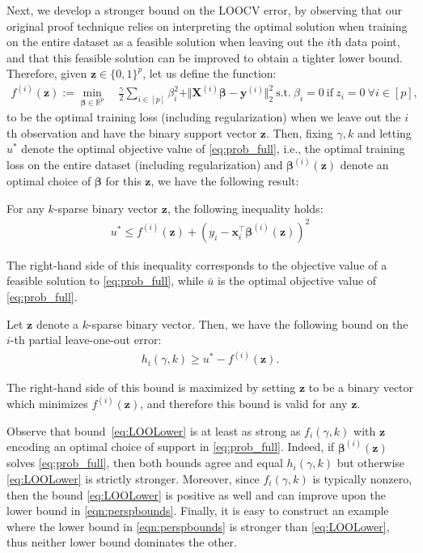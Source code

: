 \documentclass[opre,nonblindrev]{informs3} %
\begin{document}
Next, we develop a stronger bound on the LOOCV error, by observing that our original proof technique relies on interpreting the optimal solution when training on the entire dataset as a feasible solution when leaving out the $i$th data point, and that this feasible solution can be improved to obtain a tighter lower bound. Therefore, {given $\bm{z}\in \{0,1\}^p$,} let us define the function:
\begin{align*}
    f^{(i)}(\bm{z}):=\min_{\bm{\beta} \in \mathbb{R}^p} \quad \frac{\gamma}{2}\sum_{i \in [p]}\beta_i^2+\Vert \bm{X}^{(i)}\bm{\beta}-\bm{y}^{(i)}\Vert_2^2 \ \text{s.t.} \ \beta_i=0 \ \text{if} \ z_i=0 \ \forall i \in [p],
\end{align*}
to be the optimal training loss (including regularization) when we leave out the $i$th observation and have the binary support vector $\bm{z}$. Then, fixing $\gamma, k$ and letting $u^*$ denote the optimal objective value of \eqref{eq:prob_full}, i.e., the optimal training loss on the entire dataset (including regularization) and $\bm{\beta}^{(i)}(\bm{z})$ denote an optimal choice of $\bm{\beta}$ for this $\bm{z}$, we have the following result:
\begin{proposition}\label{prop2}
For any $k$-sparse binary vector $\bm{z}$, the following inequality holds:
\begin{align}
    u^*\leq f^{(i)}(\bm{z})+(y_i-\bm{x}_i^\top \bm{\beta}^{(i)}(\bm{z}))^2
\end{align}
\end{proposition}
The right-hand side of this inequality corresponds to the objective value of a feasible solution to \eqref{eq:prob_full}, while $\bar{u}$ is the optimal objective value of \eqref{eq:prob_full}. \Halmos
\endproof
\begin{corollary}\label{corr:lowerbound2}
Let $\bm{z}$ denote a $k$-sparse binary vector. Then, we have the following bound on the $i$-th partial leave-one-out error:
\begin{align}\label{eq:LOOLower}
    h_i(\gamma, k) \geq u^*-f^{(i)}(\bm{z}).
\end{align}
\end{corollary}
The right-hand side of this bound is maximized by setting $\bm{z}$ to be a binary vector which minimizes $f^{(i)}(\bm{z})$, and therefore this bound is valid for any $\bm{z}$. \Halmos
\endproof
\begin{remark}
Observe that bound~\eqref{eq:LOOLower} is at least as strong as $f_i(\gamma, k)$ with $\bm{z}$ encoding an optimal choice of support in \eqref{eq:prob_full}. Indeed, if $\bm{\beta}^{(i)}(\bm{z})$ solves \eqref{eq:prob_full}, then both bounds agree and equal $h_i(\gamma, k)$ but otherwise \eqref{eq:LOOLower} is strictly stronger. Moreover, since $f_i(\gamma, k)$ is typically nonzero, then the bound \eqref{eq:LOOLower} is positive as well and can improve upon the lower bound in \eqref{eqn:perspbounds}. Finally, it is easy to construct an example where the lower bound in \eqref{eqn:perspbounds} is stronger than \eqref{eq:LOOLower}, thus neither lower bound dominates the other.
\end{remark}
\end{document}
